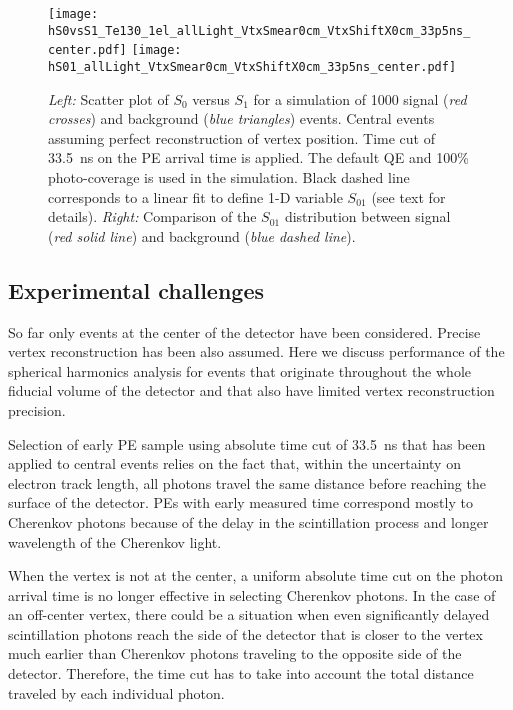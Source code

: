 \begin{figure*}[h]
  \centering
  \texttt{[image: hS0vsS1\_Te130\_1el\_allLight\_VtxSmear0cm\_VtxShiftX0cm\_33p5ns\_center.pdf]}
  \texttt{[image: hS01\_allLight\_VtxSmear0cm\_VtxShiftX0cm\_33p5ns\_center.pdf]}
  \caption{\emph{Left:} Scatter plot of $S_0$ versus $S_1$ for a simulation of 1000 signal (\emph{red crosses}) and background 
    (\emph{blue triangles}) events.
    Central events assuming perfect reconstruction of vertex position. Time cut of 33.5~ns on the PE arrival time is
    applied. The default QE and 100\% photo-coverage is used in the simulation.
    Black dashed line corresponds to a linear fit to define 1-D variable $S_{01}$ (see text for details).
    \emph{Right:} Comparison of the $S_{01}$ distribution between signal (\emph{red solid line}) and background (\emph{blue dashed line}).}
\label{fig:SL_Te_33p5ns_center}
\end{figure*}



\subsection{Experimental challenges}

So far only events at the center of the detector have been considered. Precise vertex reconstruction has been also assumed. 
Here we discuss performance of the spherical harmonics analysis for events that originate throughout the whole fiducial volume
of the detector and that also have limited vertex reconstruction precision.

Selection of early PE sample using absolute time cut of 33.5~ns that has been applied to central events relies on the fact that, 
within the uncertainty on electron track length, all photons travel the same distance before reaching the surface of the detector. 
PEs with early measured time correspond mostly to Cherenkov photons because of the delay in the scintillation process and longer 
wavelength of the Cherenkov light. 

When the vertex is not at the center, a uniform absolute time cut on the photon arrival time is no longer effective in selecting 
Cherenkov photons. In the case of an off-center vertex, there could be a situation when even significantly delayed scintillation photons 
reach the side of the detector that is closer to the vertex much earlier than Cherenkov photons traveling to the opposite side of the 
detector. Therefore, the time cut has to take into account the total distance traveled by each individual photon.

